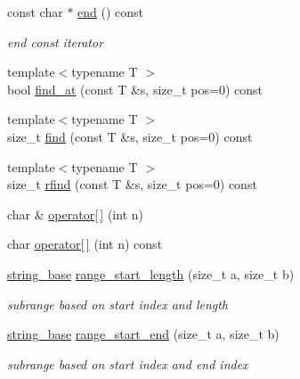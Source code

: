 \begin{DoxyCompactItemize}
const char $\ast$ \hyperlink{classhwlib_1_1string__base_acc447dff343555d3cae9a9c6251aaa21}{end} () const
\begin{DoxyCompactList}\small\item\em end const iterator \end{DoxyCompactList}\item 
{\footnotesize template$<$typename T $>$ }\\bool \hyperlink{classhwlib_1_1string__base_aa51e77269adf93d83269e99fa533d1e2}{find\+\_\+at} (const T \&s, size\+\_\+t pos=0) const
\item 
{\footnotesize template$<$typename T $>$ }\\size\+\_\+t \hyperlink{classhwlib_1_1string__base_acbe18fe0d7376795c0fb1cb059b8ce7a}{find} (const T \&s, size\+\_\+t pos=0) const
\item 
{\footnotesize template$<$typename T $>$ }\\size\+\_\+t \hyperlink{classhwlib_1_1string__base_a065d0e788feacf44abf949e88c25b7b7}{rfind} (const T \&s, size\+\_\+t pos=0) const
\item 
char \& \hyperlink{classhwlib_1_1string__base_a37cf103e3c4ed2d0a898f2cc8d407df2}{operator\mbox{[}$\,$\mbox{]}} (int n)
\item 
char \hyperlink{classhwlib_1_1string__base_a9b6bbc5ff933b8e9c5458b61d5c73f4e}{operator\mbox{[}$\,$\mbox{]}} (int n) const
\item 
\mbox{\label{classhwlib_1_1string__base_a82103a00c45270425719272f2f90ef1a}} 
\hyperlink{classhwlib_1_1string__base}{string\+\_\+base} \hyperlink{classhwlib_1_1string__base_a82103a00c45270425719272f2f90ef1a}{range\+\_\+start\+\_\+length} (size\+\_\+t a, size\+\_\+t b)
\begin{DoxyCompactList}\small\item\em subrange based on start index and length \end{DoxyCompactList}\item 
\mbox{\label{classhwlib_1_1string__base_a953662589f859e4d7627232cc87d36a2}} 
\hyperlink{classhwlib_1_1string__base}{string\+\_\+base} \hyperlink{classhwlib_1_1string__base_a953662589f859e4d7627232cc87d36a2}{range\+\_\+start\+\_\+end} (size\+\_\+t a, size\+\_\+t b)
\begin{DoxyCompactList}\small\item\em subrange based on start index and end index \end{DoxyCompactList}\item 

\end{DoxyCompactItemize}
